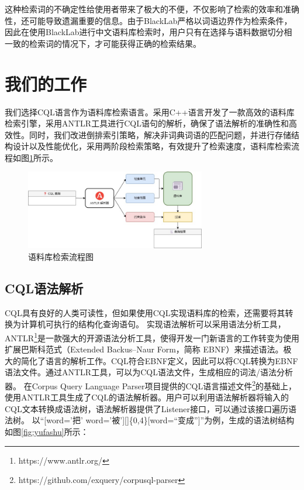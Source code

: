 \documentclass[11pt]{article}
\begin{document}
\begin{CJK*}{UTF8}{gbsn}
这种检索词的不确定性给使用者带来了极大的不便，不仅影响了检索的效率和准确性，还可能导致遗漏重要的信息。由于BlackLab严格以词语边界作为检索条件，因此在使用BlackLab进行中文语料库检索时，用户只有在选择与语料数据切分相一致的检索词的情况下，才可能获得正确的检索结果。

\section{我们的工作}

我们选择CQL语言作为语料库检索语言。采用C++语言开发了一款高效的语料库检索引擎，采用ANTLR工具进行CQL语句的解析，确保了语法解析的准确性和高效性。同时，我们改进倒排索引策略，解决非词典词语的匹配问题，并进行存储结构设计以及性能优化，采用两阶段检索策略，有效提升了检索速度，语料库检索流程如图\ref{fig:liucheng}所示。

\begin{figure}[!h]
	\centering
	\includegraphics[width=0.7\textwidth]{image/liuchengtu.jpg}
	\caption{语料库检索流程图}
	\label{fig:liucheng}
\end{figure}

\subsection{CQL语法解析}

CQL具有良好的人类可读性，但如果使用CQL实现语料库的检索，还需要将其转换为计算机可执行的结构化查询语句。
实现语法解析可以采用语法分析工具，ANTLR\footnote[1]{https://www.antlr.org/}是一款强大的开源语法分析工具，使得开发一门新语言的工作转变为使用扩展巴斯科范式（Extended Backus–Naur Form，简称 EBNF）来描述语法。极大的简化了语言的解析工作。CQL符合EBNF定义，因此可以将CQL转换为EBNF语法文件。通过ANTLR工具，可以为CQL语法文件，生成相应的词法/语法分析器。
在Corpus Query Language Parser项目提供的CQL语言描述文件\footnote[1]{https://github.com/exquery/corpusql-parser}的基础上，使用ANTLR工具生成了CQL的语法解析器。用户可以利用语法解析器将输入的CQL文本转换成语法树，语法解析器提供了Listener接口，可以通过该接口遍历语法树。
以“[word='把' \textbar word='被'][]\{0,4\}[word=“变成”]”为例，生成的语法树结构如图\ref{fig:yufashu}所示：


\end{CJK*}
\end{document}
